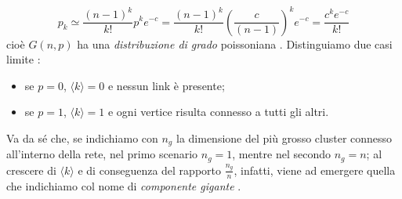 \begin{equation}
p_k  \simeq \frac{ \left(n - 1 \right)^{k}}{k!} p^k e^{- c} = \frac{ \left(n - 1 \right)^{k}}{k!} \left( \frac{c}{ \left(n - 1 \right)} \right)^k e^{- c} = \frac{ c^k e^{- c}}{k!}
\end{equation}
cioè $ G \left(n,p \right) $ ha una \emph{distribuzione di grado} poissoniana \cite{Newman}. Distinguiamo due casi limite \cite{Barabasi}:
\begin{itemize}
\item se $ p = 0 $, $ \langle k \rangle = 0 $ e nessun link è presente; \\
\item se $ p = 1 $, $ \langle k \rangle = 1 $ e ogni vertice risulta connesso a tutti gli altri.
\end{itemize} 
Va da sé che, se indichiamo con $ n_g $ la dimensione del più grosso cluster connesso all'interno della rete, nel primo scenario $ n_g = 1 $, mentre nel secondo $ n_g = n $; al crescere di $ \langle k \rangle $ e di conseguenza del rapporto $ \frac{n_g}{n} $, infatti, viene ad emergere quella che indichiamo col nome di \emph{componente gigante} \cite{Erdos}.